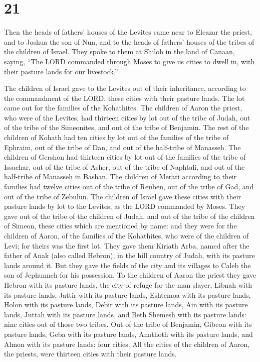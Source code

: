 \hypertarget{section-20}{%
\section{21}\label{section-20}}

 Then the heads of fathers' houses of the Levites came near
to Eleazar the priest, and to Joshua the son of Nun, and to the heads of
fathers' houses of the tribes of the children of Israel. 
They spoke to them at Shiloh in the land of Canaan, saying, ``The LORD
commanded through Moses to give us cities to dwell in, with their
pasture lands for our livestock.''

 The children of Israel gave to the Levites out of their
inheritance, according to the commandment of the LORD, these cities with
their pasture lands.  The lot came out for the families of
the Kohathites. The children of Aaron the priest, who were of the
Levites, had thirteen cities by lot out of the tribe of Judah, out of
the tribe of the Simeonites, and out of the tribe of Benjamin.
 The rest of the children of Kohath had ten cities by lot
out of the families of the tribe of Ephraim, out of the tribe of Dan,
and out of the half-tribe of Manasseh.  The children of
Gershon had thirteen cities by lot out of the families of the tribe of
Issachar, out of the tribe of Asher, out of the tribe of Naphtali, and
out of the half-tribe of Manasseh in Bashan.  The children
of Merari according to their families had twelve cities out of the tribe
of Reuben, out of the tribe of Gad, and out of the tribe of Zebulun.
 The children of Israel gave these cities with their pasture
lands by lot to the Levites, as the LORD commanded by Moses.
 They gave out of the tribe of the children of Judah, and
out of the tribe of the children of Simeon, these cities which are
mentioned by name:  and they were for the children of
Aaron, of the families of the Kohathites, who were of the children of
Levi; for theirs was the first lot.  They gave them Kiriath
Arba, named after the father of Anak (also called Hebron), in the hill
country of Judah, with its pasture lands around it.  But
they gave the fields of the city and its villages to Caleb the son of
Jephunneh for his possession.  To the children of Aaron the
priest they gave Hebron with its pasture lands, the city of refuge for
the man slayer, Libnah with its pasture lands,  Jattir with
its pasture lands, Eshtemoa with its pasture lands,  Holon
with its pasture lands, Debir with its pasture lands,  Ain
with its pasture lands, Juttah with its pasture lands, and Beth Shemesh
with its pasture lands: nine cities out of those two tribes.
 Out of the tribe of Benjamin, Gibeon with its pasture
lands, Geba with its pasture lands,  Anathoth with its
pasture lands, and Almon with its pasture lands: four cities.
 All the cities of the children of Aaron, the priests, were
thirteen cities with their pasture lands.

